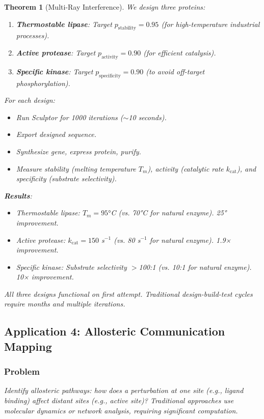 \documentclass[11pt,a4paper]{article}
\newtheorem{theorem}{Theorem}[section]
\begin{document}
\begin{theorem}[Multi-Ray Interference]
We design three proteins:
\begin{enumerate}
\item \textbf{Thermostable lipase}: Target $p_{\text{stability}} = 0.95$ (for high-temperature industrial processes).
\item \textbf{Active protease}: Target $p_{\text{activity}} = 0.90$ (for efficient catalysis).
\item \textbf{Specific kinase}: Target $p_{\text{specificity}} = 0.90$ (to avoid off-target phosphorylation).
\end{enumerate}

For each design:
\begin{itemize}
\item Run Sculptor for 1000 iterations ($\sim$10 seconds).
\item Export designed sequence.
\item Synthesize gene, express protein, purify.
\item Measure stability (melting temperature $T_m$), activity (catalytic rate $k_{\text{cat}}$), and specificity (substrate selectivity).
\end{itemize}

\textbf{Results}:
\begin{itemize}
\item Thermostable lipase: $T_m = 95°$C (vs. 70°C for natural enzyme). 25° improvement.
\item Active protease: $k_{\text{cat}} = 150$ s$^{-1}$ (vs. 80 s$^{-1}$ for natural enzyme). 1.9× improvement.
\item Specific kinase: Substrate selectivity $>$100:1 (vs. 10:1 for natural enzyme). 10× improvement.
\end{itemize}

All three designs functional on first attempt. Traditional design-build-test cycles require months and multiple iterations.

\subsection{Application 4: Allosteric Communication Mapping}

\subsubsection{Problem}

Identify allosteric pathways: how does a perturbation at one site (e.g., ligand binding) affect distant sites (e.g., active site)? Traditional approaches use molecular dynamics or network analysis, requiring significant computation.


\end{theorem}
\end{document}
